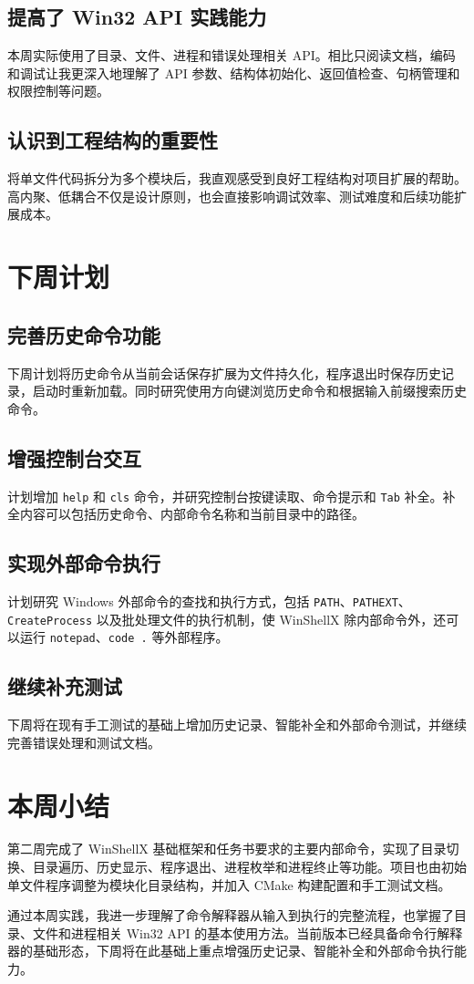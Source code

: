 \documentclass[UTF8]{ctexart}
\begin{document}
\subsection{提高了 Win32 API 实践能力}

本周实际使用了目录、文件、进程和错误处理相关 API。相比只阅读文档，编码和调试让我更深入地理解了 API 参数、结构体初始化、返回值检查、句柄管理和权限控制等问题。

\subsection{认识到工程结构的重要性}

将单文件代码拆分为多个模块后，我直观感受到良好工程结构对项目扩展的帮助。高内聚、低耦合不仅是设计原则，也会直接影响调试效率、测试难度和后续功能扩展成本。

\section{下周计划}

\subsection{完善历史命令功能}

下周计划将历史命令从当前会话保存扩展为文件持久化，程序退出时保存历史记录，启动时重新加载。同时研究使用方向键浏览历史命令和根据输入前缀搜索历史命令。

\subsection{增强控制台交互}

计划增加 \texttt{help} 和 \texttt{cls} 命令，并研究控制台按键读取、命令提示和 \texttt{Tab} 补全。补全内容可以包括历史命令、内部命令名称和当前目录中的路径。

\subsection{实现外部命令执行}

计划研究 Windows 外部命令的查找和执行方式，包括 \texttt{PATH}、\texttt{PATHEXT}、\texttt{CreateProcess} 以及批处理文件的执行机制，使 WinShellX 除内部命令外，还可以运行 \texttt{notepad}、\texttt{code .} 等外部程序。

\subsection{继续补充测试}

下周将在现有手工测试的基础上增加历史记录、智能补全和外部命令测试，并继续完善错误处理和测试文档。

\section{本周小结}

第二周完成了 WinShellX 基础框架和任务书要求的主要内部命令，实现了目录切换、目录遍历、历史显示、程序退出、进程枚举和进程终止等功能。项目也由初始单文件程序调整为模块化目录结构，并加入 CMake 构建配置和手工测试文档。

通过本周实践，我进一步理解了命令解释器从输入到执行的完整流程，也掌握了目录、文件和进程相关 Win32 API 的基本使用方法。当前版本已经具备命令行解释器的基础形态，下周将在此基础上重点增强历史记录、智能补全和外部命令执行能力。
\end{document}
